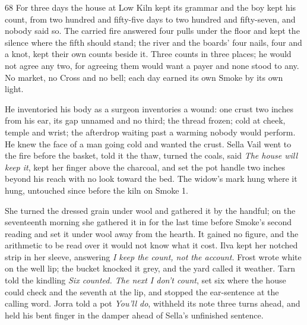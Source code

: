 
\scenebreak


\scenebreak


\scenebreak

\CRtailpiece
\begin{CRchronicle}{68}
For three days the house at Low Kiln kept its grammar and the boy kept his count, from two hundred and fifty-five days to two hundred and fifty-seven, and nobody said so. The carried fire answered four pulls under the floor and kept the silence where the fifth should stand; the river and the boards’ four nails, four and a knot, kept their own counts beside it. Three counts in three places; he would not agree any two, for agreeing them would want a payer and none stood to any. No market, no Cross and no bell; each day earned its own Smoke by its own light.

He inventoried his body as a surgeon inventories a wound: one crust two inches from his ear, its gap unnamed and no third; the thread frozen; cold at cheek, temple and wrist; the afterdrop waiting past a warming nobody would perform. He knew the face of a man going cold and wanted the crust. Sella Vail went to the fire before the basket, told it the thaw, turned the coals, said \emph{The house will keep it}, kept her finger above the charcoal, and set the pot handle two inches beyond his reach with no look toward the bed. The widow’s mark hung where it hung, untouched since before the kiln on Smoke 1.

She turned the dressed grain under wool and gathered it by the handful; on the seventeenth morning she gathered it in for the last time before Smoke’s second reading and set it under wool away from the hearth. It gained no figure, and the arithmetic to be read over it would not know what it cost. Ilva kept her notched strip in her sleeve, answering \emph{I keep the count, not the account.} Frost wrote white on the well lip; the bucket knocked it grey, and the yard called it weather. Tarn told the kindling \emph{Six counted. The next I don’t count}, set six where the house could check and the seventh at the lip, and stopped the ear-sentence at the calling word. Jorra told a pot \emph{You’ll do}, withheld its note three turns ahead, and held his bent finger in the damper ahead of Sella’s unfinished sentence.


\end{CRchronicle}
